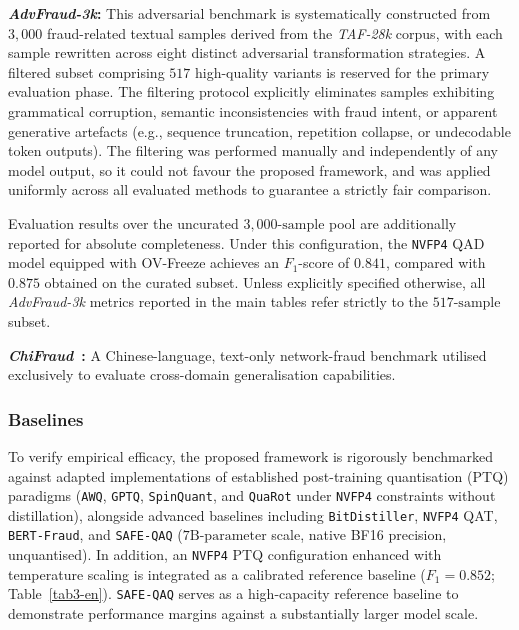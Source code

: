 \documentclass[a4paper,fleqn]{cas-sc}
\begin{document}
\textbf{\textit{AdvFraud-3k}:} This adversarial benchmark is systematically constructed from $3{,}000$ fraud-related textual samples derived from the \textit{TAF-28k} corpus, with each sample rewritten across eight distinct adversarial transformation strategies. A filtered subset comprising $517$ high-quality variants is reserved for the primary evaluation phase. The filtering protocol explicitly eliminates samples exhibiting grammatical corruption, semantic inconsistencies with fraud intent, or apparent generative artefacts (e.g., sequence truncation, repetition collapse, or undecodable token outputs). The filtering was performed manually and independently of any model output, so it could not favour the proposed framework, and was applied uniformly across all evaluated methods to guarantee a strictly fair comparison.

Evaluation results over the uncurated $3{,}000\text{-sample}$ pool are additionally reported for absolute completeness. Under this configuration, the \texttt{NVFP4} QAD model equipped with OV-Freeze achieves an $F_1$-score of $0.841$, compared with $0.875$ obtained on the curated subset. Unless explicitly specified otherwise, all \textit{AdvFraud-3k} metrics reported in the main tables refer strictly to the $517\text{-sample}$ subset.

\textbf{\textit{ChiFraud}~\citep{chifraud}:} A Chinese-language, text-only network-fraud benchmark utilised exclusively to evaluate cross-domain generalisation capabilities.

\subsubsection{Baselines}

To verify empirical efficacy, the proposed framework is rigorously benchmarked against adapted implementations of established post-training quantisation (PTQ) paradigms (\texttt{AWQ}, \texttt{GPTQ}, \texttt{SpinQuant}, and \texttt{QuaRot} under \texttt{NVFP4} constraints without distillation), alongside advanced baselines including \texttt{BitDistiller}, \texttt{NVFP4} QAT, \texttt{BERT-Fraud}, and \texttt{SAFE-QAQ} ($7\text{B-parameter}$ scale, native BF16 precision, unquantised). In addition, an \texttt{NVFP4} PTQ configuration enhanced with temperature scaling is integrated as a calibrated reference baseline ($F_1 = 0.852$; Table~\ref{tab3-en}). \texttt{SAFE-QAQ} serves as a high-capacity reference baseline to demonstrate performance margins against a substantially larger model scale.
\end{document}

